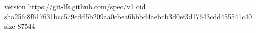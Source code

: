 version https://git-lfs.github.com/spec/v1
oid sha256:8f617631bcc579cdd5b209aa0cbea6bbbd4aebcb3d0ef3d17643cdd455541c40
size 87544
